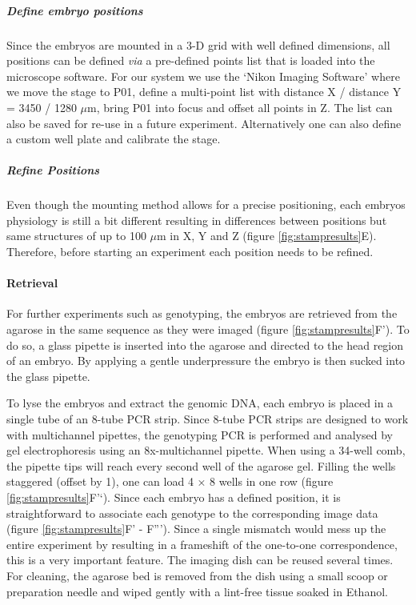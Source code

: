 \documentclass[11pt,singlespacinge,twoside]{reedthesis} %
\theoremstyle{definition}
\theoremstyle{definition}
\theoremstyle{definition}
\theoremstyle{remark}
\begin{document}
\hypertarget{define-embryo-positions}{%
\subparagraph{Define embryo positions}\label{define-embryo-positions}}

Since the embryos are mounted in a 3-D grid with well defined dimensions, all positions can be defined \emph{via} a pre-defined points list that is loaded into the microscope software. For our system we use the `Nikon Imaging Software' where we move the stage to P01, define a multi-point list with distance X / distance Y = 3450 / 1280 \(\mu\)m, bring P01 into focus and offset all points in Z. The list can also be saved for re-use in a future experiment. Alternatively one can also define a custom well plate and calibrate the stage.

\hypertarget{refine-positions}{%
\subparagraph{Refine Positions}\label{refine-positions}}

Even though the mounting method allows for a precise positioning, each embryos physiology is still a bit different resulting in differences between positions but same structures of up to 100 \(\mu\)m in X, Y and Z (figure \ref{fig:stampresults}E). Therefore, before starting an experiment each position needs to be refined.

\hypertarget{retrieval}{%
\paragraph{Retrieval}\label{retrieval}}

For further experiments such as genotyping, the embryos are retrieved from the agarose in the same sequence as they were imaged (figure \ref{fig:stampresults}F'). To do so, a glass pipette is inserted into the agarose and directed to the head region of an embryo. By applying a gentle underpressure the embryo is then sucked into the glass pipette.

To lyse the embryos and extract the genomic DNA, each embryo is placed in a single tube of an 8-tube PCR strip. Since 8-tube PCR strips are designed to work with multichannel pipettes, the genotyping PCR is performed and analysed by gel electrophoresis using an 8x-multichannel pipette. When using a 34-well comb, the pipette tips will reach every second well of the agarose gel. Filling the wells staggered (offset by 1), one can load 4 × 8 wells in one row (figure \ref{fig:stampresults}F'`). Since each embryo has a defined position, it is straightforward to associate each genotype to the corresponding image data (figure \ref{fig:stampresults}F' - F'''). Since a single mismatch would mess up the entire experiment by resulting in a frameshift of the one-to-one correspondence, this is a very important feature. The imaging dish can be reused several times. For cleaning, the agarose bed is removed from the dish using a small scoop or preparation needle and wiped gently with a lint-free tissue soaked in Ethanol.
\end{document}
